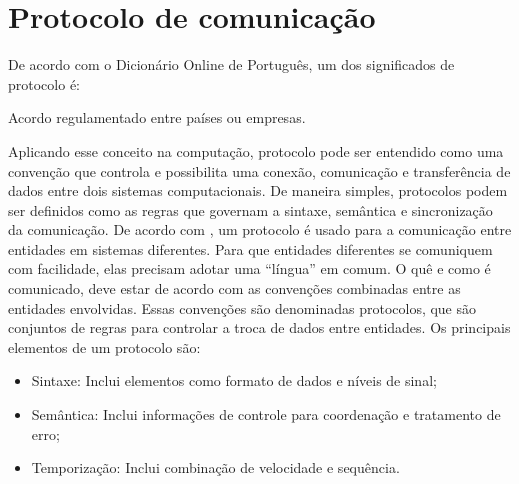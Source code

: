 \section{Protocolo de comunicação}
De acordo com o Dicionário Online de Português, um dos significados de 
protocolo é:
\begin{citacao}
Acordo regulamentado entre países ou empresas. \cite{dicionario}
\end{citacao}
Aplicando esse conceito na computação, protocolo pode ser entendido como uma 
convenção que controla e possibilita uma conexão, comunicação e transferência 
de dados entre dois sistemas computacionais. De maneira simples, protocolos 
podem ser definidos como as regras que governam a sintaxe, semântica e 
sincronização da comunicação. 
De acordo com , um protocolo é usado para a 
comunicação entre entidades em sistemas diferentes. Para que entidades 
diferentes se comuniquem com facilidade, elas precisam adotar uma ``língua'' em 
comum. O quê e como é comunicado, deve estar de acordo com as convenções 
combinadas entre as entidades envolvidas. Essas convenções são denominadas 
protocolos, que são conjuntos de regras para controlar a troca de 
dados entre entidades. Os principais elementos de um protocolo são:
\begin{itemize}
	\item Sintaxe: Inclui elementos como formato de dados e níveis de sinal;
	\item Semântica: Inclui informações de controle para coordenação e 
	tratamento de erro;
	\item Temporização: Inclui combinação de velocidade e sequência.
\end{itemize}
